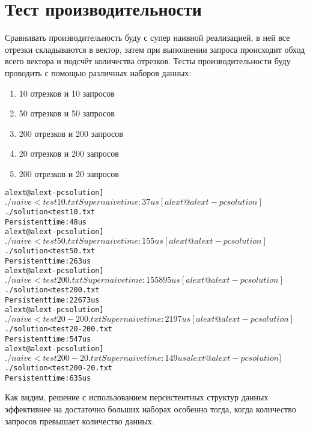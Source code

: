 \section{Тест производительности}
Сравнивать производительность буду с супер наивной реализацией, в ней все отрезки складываются в вектор, затем при выполнении запроса происходит обход всего вектора и подсчёт количества отрезков.
Тесты производительности буду проводить с помощью различных наборов данных:

\begin{enumerate}
    \item 10 отрезков и 10 запросов
    \item 50 отрезков и 50 запросов
    \item 200 отрезков и 200 запросов
    \item 20 отрезков и 200 запросов
    \item 200 отрезков и 20 запросов
\end{enumerate}

\begin{alltt}
    alext@alext-pc solution]$ ./naive < test10.txt 
    Super naive time: 37us
    [alext@alext-pc solution]$ ./solution < test10.txt 
    Persistent time: 48us
    alext@alext-pc solution]$ ./naive < test50.txt
    Super naive time: 155us
    [alext@alext-pc solution]$ ./solution < test50.txt 
    Persistent time: 263us
    alext@alext-pc solution]$ ./naive < test200.txt
    Super naive time: 155895us
    [alext@alext-pc solution]$ ./solution < test200.txt
    Persistent time: 22673us
    alext@alext-pc solution]$ ./naive < test20-200.txt
    Super naive time: 2197us
    [alext@alext-pc solution]$ ./solution < test20-200.txt
    Persistent time: 547us
    alext@alext-pc solution]$ ./naive < test200-20.txt
    Super naive time: 149us
    alext@alext-pc solution]$ ./solution < test200-20.txt
    Persistent time: 635us
\end{alltt}

Как видим, решение с использованием персистентных структур данных эффективнее на достаточно больших наборах особенно тогда, когда количество запросов превышает количество данных.

\pagebreak
